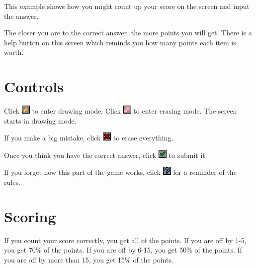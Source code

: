 \documentclass[12pt]{book}
\begin{document}
		This example shows how you might count up your score on the screen and input the answer.

		The closer you are to the correct answer, the more points you will get. There is a help button on this screen which reminds you how many points each item is worth.
		\section{Controls}
			Click \includegraphics[height=\baselineskip]{Pencil} to enter drawing mode. Click \includegraphics[height=\baselineskip]{Eraser} to enter erasing mode. The screen starts in drawing mode.

			If you make a big mistake, click \includegraphics[height=\baselineskip]{Clear} to erase everything.

			Once you think you have the correct answer, click \includegraphics[height=\baselineskip]{Check} to submit it.

			If you forget how this part of the game works, click \includegraphics[height=\baselineskip]{Help} for a reminder of the rules.
		\section{Scoring}
			If you count your score correctly, you get all of the points. If you are off by 1-5, you get 70\% of the points. If you are off by 6-15, you get 50\% of the points. If you are off by more than 15, you get 15\% of the points.
\end{document}
